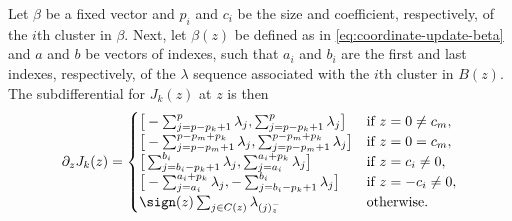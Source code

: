 \begin{theorem}\label{thm:cluster-subdifferential}
  Let \(\beta\) be a fixed vector and \(p_i\) and \(c_i\) be the size and
  coefficient, respectively, of the \(i\)th cluster in \(\beta\).
  Next, let \(\beta(z)\) be defined as in \eqref{eq:coordinate-update-beta}
  and \(a\) and \(b\) be vectors of indexes, such that
  \(a_i\) and \(b_i\) are the first and last indexes, respectively,
  of the \(\lambda\) sequence associated with the \(i\)th cluster
  in \(B(z)\). The subdifferential for \(J_k(z)\) at \(z\) is
  then
  \[
    \partial_{z} J_k(z) =
    \begin{cases}
      \big[-\sum_{j = p - p_k + 1}^{p}\lambda_j, \sum_{j = p - p_k + 1}^{p}\lambda_j\big]                         & \text{if } z = 0 \neq c_m,  \\
      \big[-\sum_{j = p - p_m + 1}^{p - p_m + p_k}\lambda_j, \sum_{j = p - p_m + 1}^{p - p_m + p_k}\lambda_j\big] & \text{if } z = 0 = c_m,     \\
      \big[\sum_{j = b_i - p_k + 1}^{b_i}\lambda_j, \sum_{j = a_i}^{a_i + p_k} \lambda_j\big]                     & \text{if } z = c_i \neq 0,  \\
      \big[-\sum_{j = a_i}^{a_i + p_k} \lambda_j, -\sum_{j = b_i - p_k + 1}^{b_i}\lambda_j\big]                   & \text{if } z = -c_i \neq 0, \\
      \sign(z)\sum_{j \in C(z)} \lambda_{(j)^-_z}                                                                 & \text{otherwise.}           \\
    \end{cases}
  \]
\end{theorem}
